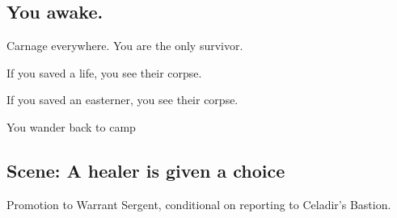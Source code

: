 \begin{multicols}{2}
\subsection{You awake.}

Carnage everywhere.
You are the only survivor.

If you saved a life, you see their corpse.

If you saved an easterner, you see their corpse.

You wander back to camp

\subsection{Scene: A healer is given a choice}

Promotion to Warrant Sergent, conditional on reporting to Celadir's Bastion.

\end{multicols}
